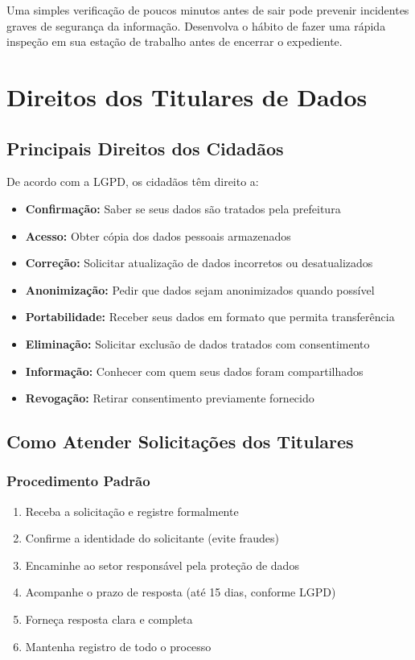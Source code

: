 \documentclass[12pt,a4paper]{article}
\begin{document}
\begin{tcolorbox}[colback=amareloclaro, colframe=orange!75!black, title=Lembre-se]
Uma simples verificação de poucos minutos antes de sair pode prevenir incidentes graves de segurança da informação. Desenvolva o hábito de fazer uma rápida inspeção em sua estação de trabalho antes de encerrar o expediente.
\end{tcolorbox}

\newpage
\section{Direitos dos Titulares de Dados}

\subsection{Principais Direitos dos Cidadãos}
De acordo com a LGPD, os cidadãos têm direito a:
\begin{itemize}
    \item \textbf{Confirmação:} Saber se seus dados são tratados pela prefeitura
    \item \textbf{Acesso:} Obter cópia dos dados pessoais armazenados
    \item \textbf{Correção:} Solicitar atualização de dados incorretos ou desatualizados
    \item \textbf{Anonimização:} Pedir que dados sejam anonimizados quando possível
    \item \textbf{Portabilidade:} Receber seus dados em formato que permita transferência
    \item \textbf{Eliminação:} Solicitar exclusão de dados tratados com consentimento
    \item \textbf{Informação:} Conhecer com quem seus dados foram compartilhados
    \item \textbf{Revogação:} Retirar consentimento previamente fornecido
\end{itemize}

\subsection{Como Atender Solicitações dos Titulares}

\subsubsection{Procedimento Padrão}
\begin{enumerate}
    \item Receba a solicitação e registre formalmente
    \item Confirme a identidade do solicitante (evite fraudes)
    \item Encaminhe ao setor responsável pela proteção de dados
    \item Acompanhe o prazo de resposta (até 15 dias, conforme LGPD)
    \item Forneça resposta clara e completa
    \item Mantenha registro de todo o processo
\end{enumerate}
\end{document}

